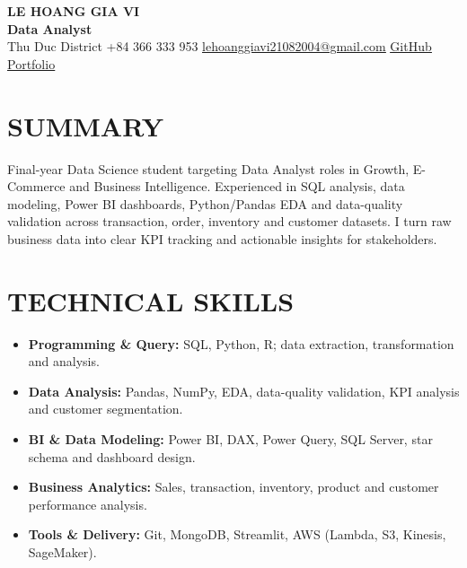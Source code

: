 \documentclass[10pt,letterpaper]{article}
\newcommand{\cvsection}[2]{\section*{\faIcon{#1}\hspace{0.45em}#2}}
\newcommand{\cvlink}[2]{\href{#1}{\underline{#2}}}
\newcommand{\cvitem}[1]{\item \small #1}
\begin{document}
\begin{center}
  {\fontsize{20}{22}\selectfont\bfseries LE HOANG GIA VI}\\[0.22em]
  {\fontsize{17}{19}\selectfont\bfseries Data Analyst}\\[0.42em]
  {\small
  \hspace{0.2em}Thu Duc District
  \quad
  \hspace{0.2em}+84 366 333 953
  \quad
  \hspace{0.2em}\cvlink{mailto:lehoanggiavi21082004@gmail.com}{lehoanggiavi21082004@gmail.com}
  \quad
  \hspace{0.2em}\cvlink{https://github.com/lehoanggiavi}{GitHub}
  \quad
  \hspace{0.2em}\cvlink{https://lehoanggiavi.github.io/portfolio/?role=da}{Portfolio}}
\end{center}

\cvsection{user}{SUMMARY}
\normalsize
Final-year Data Science student targeting Data Analyst roles in Growth, E-Commerce and Business
Intelligence. Experienced in SQL analysis, data modeling, Power BI dashboards, Python/Pandas EDA
and data-quality validation across transaction, order, inventory and customer datasets. I turn raw
business data into clear KPI tracking and actionable insights for stakeholders.

\cvsection{tools}{TECHNICAL SKILLS}
\begin{itemize}[leftmargin=1.55em,itemsep=0em,topsep=0em,parsep=0em]
  \cvitem{\textbf{Programming \& Query:} SQL, Python, R; data extraction, transformation and analysis.}
  \cvitem{\textbf{Data Analysis:} Pandas, NumPy, EDA, data-quality validation, KPI analysis and customer segmentation.}
  \cvitem{\textbf{BI \& Data Modeling:} Power BI, DAX, Power Query, SQL Server, star schema and dashboard design.}
  \cvitem{\textbf{Business Analytics:} Sales, transaction, inventory, product and customer performance analysis.}
  \cvitem{\textbf{Tools \& Delivery:} Git, MongoDB, Streamlit, AWS (Lambda, S3, Kinesis, SageMaker).}
\end{itemize}
\end{document}
